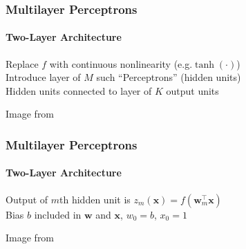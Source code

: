 \documentclass[xetex,professionalfont]{beamer}
\newcommand{\eg}{\mbox{e.g.}\xspace} %
\renewcommand{\vec}[1]{\ensuremath{\mathbf{#1}}}
\newcommand{\vw}{\vec{w}}
\newcommand{\vx}{\vec{x}}
\begin{document}
\begin{frame}
\frametitle{Multilayer Perceptrons}
\framesubtitle{Two-Layer Architecture}


Replace $f$ with continuous nonlinearity (\eg $\tanh(\cdot)$)\\\medskip %
Introduce layer of $M$ such \enquote{Perceptrons} (hidden units)\\\medskip %
Hidden units connected to layer of $K$ output units

\begin{center}
	{\centering Image from \cite{bishop2006}}
\end{center}

\end{frame}


\begin{frame}
\frametitle{Multilayer Perceptrons}
\framesubtitle{Two-Layer Architecture}

Output of $m$th hidden unit is $z_m(\vx)=f(\vw_m^\top\vx)$\\\medskip
Bias $b$ included in $\vw$ and $\vx$, $w_0=b$, $x_0=1$

\bigskip
\begin{center}
	{\centering Image from \cite{bishop2006}}
\end{center}

\end{frame}
\end{document}
